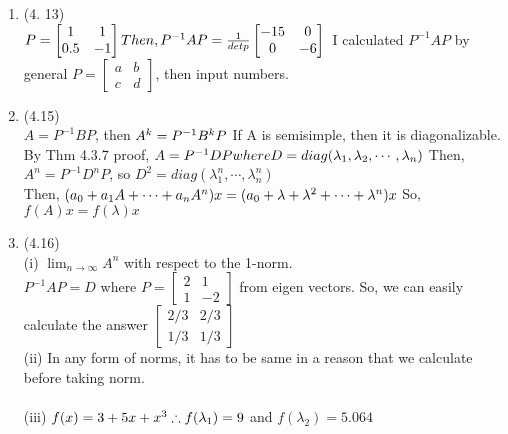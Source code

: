 \documentclass[letterpaper,12pt]{article}
\theoremstyle{definition}
\begin{document}
\begin{enumerate}
	\item (4. 13) \\
$P = \begin{bmatrix} 1&1 \\ 0.5&-1 \end{bmatrix}\\
Then, P^{-1}AP=\frac{1}{detp} \begin{bmatrix} -15&0 \\ 0&-6 \end{bmatrix}\\$
I calculated $P^{-1}AP$ by general $P=\begin{bmatrix} a&b \\ c&d \end{bmatrix}$, then input numbers.



	\item (4.15) \\
$A=P^{-1}BP$, then $A^k= P^{-1}B^kP\\$
If A is semisimple, then it is diagonalizable. By Thm 4.3.7 proof, $A=P^{-1}DP where D=diag(\lambda_1,\lambda_2, \cdots, \lambda_n)\\$
Then, 
$A^n= P^{-1}D^nP$, so $D^2=diag(\lambda_1^{n}, \cdots, \lambda_n^{n})$\\
Then, $(a_0+a_1A+ \cdots +a_nA^n)x=(a_0+\lambda + \lambda^2 + \cdots + \lambda^n)x\\$
So, $f(A)x = f(\lambda)x$





	\item (4.16) \\
(i) $\lim_{n\rightarrow\infty} A^n $ with respect to the 1-norm. \\
$P^{-1}AP=D$ where $P=\begin{bmatrix} 2&1 \\ 1&-2 \end{bmatrix}$ from eigen vectors.
So, we can easily calculate the answer $\begin{bmatrix} 2/3&2/3 \\ 1/3& 1/3\end{bmatrix}$ \\

(ii) In any form of norms, it has to be same in a reason that we calculate before taking norm.\\ \\
(iii) $f(x) = 3+5x+x^3 \\ \therefore f(\lambda_1)=9$ and $f(\lambda_2)=5.064$





\end{enumerate}
\end{document}

